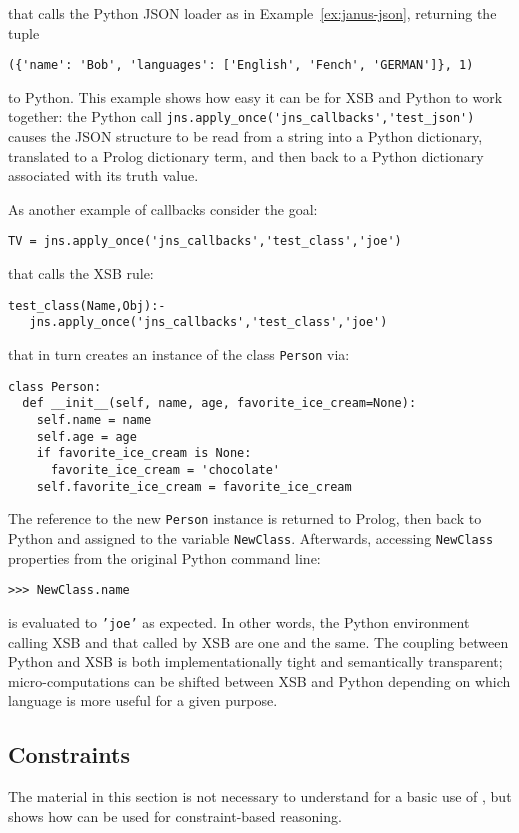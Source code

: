 \noindent
that calls the Python JSON loader as in Example~\ref{ex:janus-json}, returning the tuple
\begin{verbatim}
({'name': 'Bob', 'languages': ['English', 'Fench', 'GERMAN']}, 1)
\end{verbatim}
to Python.  This example shows how easy it can be for XSB and Python
to work together: the Python call
\verb|jns.apply_once('jns_callbacks','test_json')| causes the JSON structure
to be read from a string into a Python dictionary, translated to a
Prolog dictionary term, and then back to a Python dictionary
associated with its truth value.

As another example of callbacks consider the goal:

\begin{verbatim}
TV = jns.apply_once('jns_callbacks','test_class','joe')
\end{verbatim}
\noindent
that calls the XSB rule:
\begin{verbatim}
test_class(Name,Obj):-
   jns.apply_once('jns_callbacks','test_class','joe')
\end{verbatim}
that in turn creates an instance of the class {\tt Person} via:
\begin{verbatim}
class Person:
  def __init__(self, name, age, favorite_ice_cream=None):
    self.name = name
    self.age = age
    if favorite_ice_cream is None:
      favorite_ice_cream = 'chocolate'
    self.favorite_ice_cream = favorite_ice_cream
\end{verbatim}
The reference to the new {\tt Person} instance is returned to Prolog,
then back to Python and assigned to the variable {\tt NewClass}.
Afterwards, accessing {\tt NewClass} properties from the original
Python command line:
\begin{verbatim}
>>> NewClass.name
\end{verbatim}
is evaluated to {\tt 'joe'} as expected.  In other words, the Python
environment calling XSB and that called by XSB are one and the same.
The coupling between Python and XSB is both implementationally tight
and semantically transparent; micro-computations can be shifted between
XSB and Python depending on which language is more useful for a given
purpose.

\subsection{Constraints} 

The material in this section is not necessary to understand for a
basic use of \januspy{}, but shows how \januspy{} can be used for
constraint-based reasoning.

